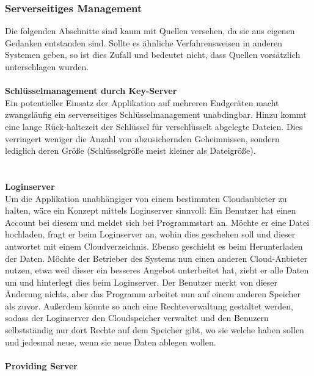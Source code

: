 \documentclass[13pt,a4paper,bibliography=totocnumbered,listof=totocnumbered]{scrartcl}
\begin{document}
\subsubsection{Serverseitiges Management}
Die folgenden Abschnitte sind kaum mit Quellen versehen, da sie aus eigenen Gedanken entstanden sind. Sollte es ähnliche Verfahrensweisen in anderen Systemen geben, so ist dies Zufall und bedeutet nicht, dass Quellen vorsätzlich unterschlagen wurden.\\\\
\textbf{Schlüsselmanagement durch Key-Server}\\
Ein potentieller Einsatz der Applikation auf mehreren Endgeräten macht zwangsläufig ein serverseitiges Schlüsselmanagement unabdingbar. Hinzu kommt eine lange Rück-haltezeit der Schlüssel für verschlüsselt abgelegte Dateien. Dies verringert weniger die Anzahl von abzusichernden Geheimnissen, sondern lediglich deren Größe (Schlüsselgröße meist kleiner als Dateigröße).\\ \cite{38}\\
\\\textbf{Loginserver}\\
Um die Applikation unabhängiger von einem bestimmten Cloudanbieter zu halten, wäre ein Konzept mittels Loginserver sinnvoll: Ein Benutzer hat einen Account bei diesem und meldet sich bei Programmstart an. Möchte er eine Datei hochladen, fragt er beim Loginserver an, wohin dies geschehen soll und dieser antwortet mit einem Cloudverzeichnis. Ebenso geschieht es beim Herunterladen der Daten. Möchte der Betrieber des Systems nun einen anderen Cloud-Anbieter nutzen, etwa weil dieser ein besseres Angebot unterbeitet hat, zieht er alle Daten um und hinterlegt dies beim Loginserver. Der Benutzer merkt von dieser Änderung nichts, aber das Programm arbeitet nun auf einem anderen Speicher als zuvor. Außerdem könnte so auch eine Rechteverwaltung gestaltet werden, sodass der Loginserver den Cloudspeicher verwaltet und den Benuzern selbstständig nur dort Rechte auf dem Speicher gibt, wo sie welche haben sollen und jedesmal neue, wenn sie neue Daten ablegen wollen.\\
\\\textbf{Providing Server}\label{provV}\\
\end{document}
